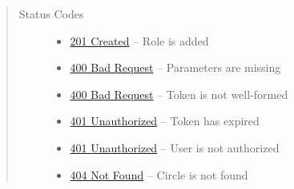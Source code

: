 \documentclass[letterpaper,10pt,english]{sphinxmanual}
\begin{document}
\begin{fulllineitems}
\begin{quote}
\begin{description}
\begin{itemize}
\end{itemize}

\item[{Status Codes}] \leavevmode\begin{itemize}
\item {} 
\href{http://www.w3.org/Protocols/rfc2616/rfc2616-sec10.html\#sec10.2.2}{201 Created} -- Role is added

\item {} 
\href{http://www.w3.org/Protocols/rfc2616/rfc2616-sec10.html\#sec10.4.1}{400 Bad Request} -- Parameters are missing

\item {} 
\href{http://www.w3.org/Protocols/rfc2616/rfc2616-sec10.html\#sec10.4.1}{400 Bad Request} -- Token is not well-formed

\item {} 
\href{http://www.w3.org/Protocols/rfc2616/rfc2616-sec10.html\#sec10.4.2}{401 Unauthorized} -- Token has expired

\item {} 
\href{http://www.w3.org/Protocols/rfc2616/rfc2616-sec10.html\#sec10.4.2}{401 Unauthorized} -- User is not authorized

\item {} 
\href{http://www.w3.org/Protocols/rfc2616/rfc2616-sec10.html\#sec10.4.5}{404 Not Found} -- Circle is not found

\end{itemize}

\end{description}\end{quote}

\end{fulllineitems}
\end{document}
